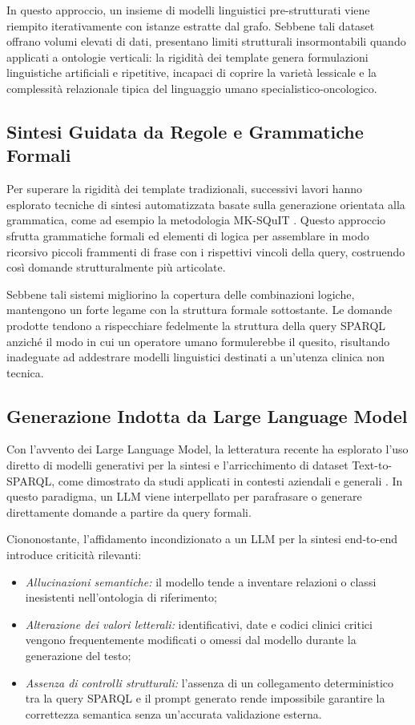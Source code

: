 \documentclass[12pt,a4paper,openright,twoside]{book}
\begin{document}
In questo approccio, un insieme di modelli linguistici pre-strutturati viene
riempito iterativamente con istanze estratte dal grafo. Sebbene tali dataset
offrano volumi elevati di dati, presentano limiti strutturali insormontabili
quando applicati a ontologie verticali: la rigidità dei template genera
formulazioni linguistiche artificiali e ripetitive, incapaci di coprire la
varietà lessicale e la complessità relazionale tipica del linguaggio umano
specialistico-oncologico.

\subsection{Sintesi Guidata da Regole e Grammatiche Formali }
Per superare la rigidità dei template tradizionali, successivi lavori hanno
esplorato tecniche di sintesi automatizzata basate sulla generazione orientata
alla grammatica, come ad esempio la metodologia MK-SQuIT \cite{mksquit}. Questo
approccio sfrutta grammatiche formali ed elementi di logica per assemblare in
modo ricorsivo piccoli frammenti di frase con i rispettivi vincoli della query,
costruendo così domande strutturalmente più articolate.

Sebbene tali sistemi migliorino la copertura delle combinazioni logiche,
mantengono un forte legame con la struttura formale sottostante. Le domande
prodotte tendono a rispecchiare fedelmente la struttura della query SPARQL
anziché il modo in cui un operatore umano formulerebbe il quesito, risultando
inadeguate ad addestrare modelli linguistici destinati a un'utenza clinica non
tecnica.

\subsection{Generazione Indotta da Large Language Model}
Con l'avvento dei Large Language Model, la letteratura recente ha esplorato
l'uso diretto di modelli generativi per la sintesi e l'arricchimento di dataset
Text-to-SPARQL, come dimostrato da studi applicati in contesti aziendali e
generali \cite{ibm2025}. In questo paradigma, un LLM viene interpellato per
parafrasare o generare direttamente domande a partire da query formali.

Ciononostante, l'affidamento incondizionato a un LLM per la sintesi end-to-end
introduce criticità rilevanti:
\begin{itemize}
    \item \textit{Allucinazioni semantiche:} il modello tende a inventare
          relazioni o classi inesistenti nell'ontologia di riferimento;
    \item \textit{Alterazione dei valori letterali:} identificativi, date e
          codici clinici critici vengono frequentemente modificati o omessi dal
          modello durante la generazione del testo;
    \item \textit{Assenza di controlli strutturali:} l'assenza di un
          collegamento deterministico tra la query SPARQL e il prompt generato
          rende impossibile garantire la correttezza semantica senza un'accurata
          validazione esterna.
\end{itemize}
\end{document}
